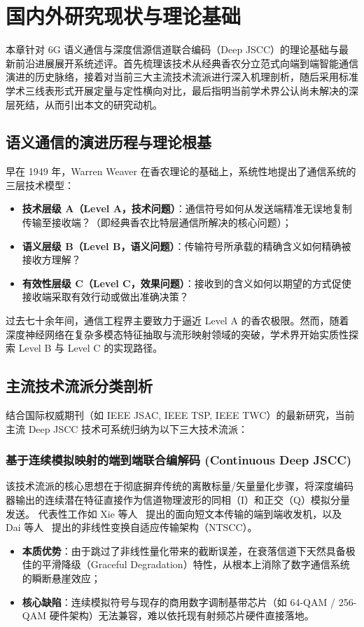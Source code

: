\chapter{国内外研究现状与理论基础}
\label{chap:related_work}

本章针对 6G 语义通信与深度信源信道联合编码（Deep JSCC）的理论基础与最新前沿进展展开系统述评。首先梳理该技术从经典香农分立范式向端到端智能通信演进的历史脉络，接着对当前三大主流技术流派进行深入机理剖析，随后采用标准学术三线表形式开展定量与定性横向对比，最后指明当前学术界公认尚未解决的深层死结，从而引出本文的研究动机。

\section{语义通信的演进历程与理论根基}
早在 1949 年，Warren Weaver 在香农理论的基础上，系统性地提出了通信系统的三层技术模型：
\begin{itemize}
  \item \textbf{技术层级 A（Level A，技术问题）}：通信符号如何从发送端精准无误地复制传输至接收端？（即经典香农比特层通信所解决的核心问题）；
  \item \textbf{语义层级 B（Level B，语义问题）}：传输符号所承载的精确含义如何精确被接收方理解？
  \item \textbf{有效性层级 C（Level C，效果问题）}：接收到的含义如何以期望的方式促使接收端采取有效行动或做出准确决策？
\end{itemize}

过去七十余年间，通信工程界主要致力于逼近 Level A 的香农极限。然而，随着深度神经网络在复杂多模态特征抽取与流形映射领域的突破，学术界开始实质性探索 Level B 与 Level C 的实现路径。

\section{主流技术流派分类剖析}
结合国际权威期刊（如 IEEE JSAC, IEEE TSP, IEEE TWC）的最新研究，当前主流 Deep JSCC 技术可系统归纳为以下三大技术流派：

\subsection{基于连续模拟映射的端到端联合编解码 (Continuous Deep JSCC)}
该技术流派的核心思想在于彻底摒弃传统的离散标量/矢量量化步骤，将深度编码器输出的连续潜在特征直接作为信道物理波形的同相（I）和正交（Q）模拟分量发送。
代表性工作如 Xie 等人~\cite{xie2021deep} 提出的面向短文本传输的端到端收发机，以及 Dai 等人~\cite{dai2022nonlinear} 提出的非线性变换自适应传输架构（NTSCC）。
\begin{itemize}
  \item \textbf{本质优势}：由于跳过了非线性量化带来的截断误差，在衰落信道下天然具备极佳的平滑降级（Graceful Degradation）特性，从根本上消除了数字通信系统的瞬断悬崖效应；
  \item \textbf{核心缺陷}：连续模拟符号与现存的商用数字调制基带芯片（如 64-QAM / 256-QAM 硬件架构）无法兼容，难以依托现有射频芯片硬件直接落地。
\end{itemize}

